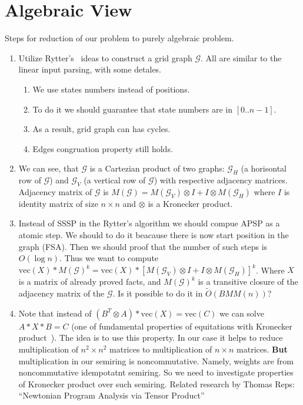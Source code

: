 \section{Algebraic View}

Steps for reduction of our problem to purely algebraic problem.
\begin{enumerate}
  \item Utilize Rytter's~\cite{Rytter} ideas to construct a grid graph $\mathcal{G}$. All are similar to the linear input parsing, with some detales.
  \begin{enumerate}
    \item We use states numbers instead of positions.
    \item To do it we should guarantee that state numbers are in $[0..n-1]$.
    \item As a result, grid graph can has cycles.
    \item Edges congruation property still holds.
  \end{enumerate}
\item We can see, that $\mathcal{G}$ is a Cartezian product of two graphs: $\mathcal{G}_H$ (a horisontal row of $\mathcal{G}$) and $\mathcal{G}_V$ (a vertical row of $\mathcal{G}$) with respective adjacency matrices.
Adjacency matrix of $\mathcal{G}$ is $M(\mathcal{G}) = M(\mathcal{G}_V) \otimes I + I \otimes M(\mathcal{G}_H)$ where $I$ is identity matrix of size $n \times n$ and $\otimes$ is a Kronecker product.
\item Instead of SSSP in the Rytter's algorithm we should compue APSP as a atomic step. We should to do it beacause there is now start position in the graph (FSA). Then we should proof that the number of such steps is $O(\log n)$.
Thus we want to compute $\text{vec}(X)*M(\mathcal{G})^k = \text{vec}(X)*[M(\mathcal{G}_V) \otimes I + I \otimes M(\mathcal{G}_H)]^k$. Where $X$ is a matrix of already proved facts, and $M(\mathcal{G})^k$ is a transitive closure of the adjacency matrix of the $\mathcal{G}$. Is it possible to do it in $\widetilde{O}(BMM(n))$?
\item Note that instead of $(B^T \otimes A) * \text{vec}(X) = \text{vec}(C)$ we can solve $A*X*B = C$ (one of fundamental properties of equitations with Kronecker product~\cite{schacke2004kronecker}).
The idea is to use this property.
In our case it helps to reduce multiplication of $n^2 \times n^2$ matrices to multiplication of $n \times n$ matrices.
\textbf{But} multiplication in our semiring is noncommutative.
Namely, weights are from noncommutative idempotatnt semiring.
So we need to investigate properties of Kronecker product over such semiring.
Related research by Thomas Reps: ``Newtonian Program Analysis via Tensor Product''~\cite{Reps:2017:NPA:3062396.3024084}
\end{enumerate}
